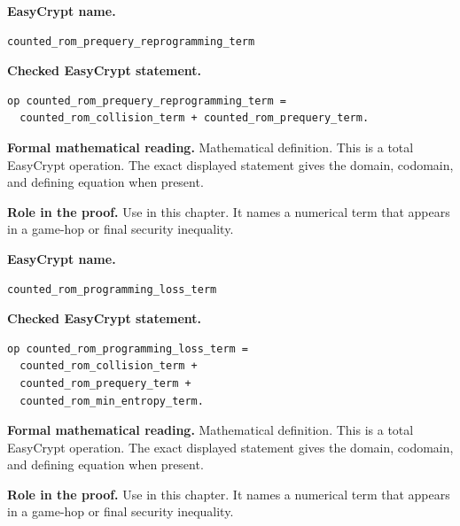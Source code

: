 \begin{formaldefinition}
\noindent\textbf{EasyCrypt name.}
\begin{lstlisting}[language=EasyCrypt,basicstyle=\ttfamily\scriptsize]
counted_rom_prequery_reprogramming_term
\end{lstlisting}
\noindent\textbf{Checked EasyCrypt statement.}
\begin{lstlisting}[language=EasyCrypt,basicstyle=\ttfamily\scriptsize]
op counted_rom_prequery_reprogramming_term =
  counted_rom_collision_term + counted_rom_prequery_term.
\end{lstlisting}
\noindent\textbf{Formal mathematical reading.}
Mathematical definition. This is a total EasyCrypt operation.  The exact displayed statement gives the domain, codomain, and defining equation when present.

\noindent\textbf{Role in the proof.}
Use in this chapter. It names a numerical term that appears in a game-hop or final security inequality.

\end{formaldefinition}

\begin{formaldefinition}
\noindent\textbf{EasyCrypt name.}
\begin{lstlisting}[language=EasyCrypt,basicstyle=\ttfamily\scriptsize]
counted_rom_programming_loss_term
\end{lstlisting}
\noindent\textbf{Checked EasyCrypt statement.}
\begin{lstlisting}[language=EasyCrypt,basicstyle=\ttfamily\scriptsize]
op counted_rom_programming_loss_term =
  counted_rom_collision_term +
  counted_rom_prequery_term +
  counted_rom_min_entropy_term.
\end{lstlisting}
\noindent\textbf{Formal mathematical reading.}
Mathematical definition. This is a total EasyCrypt operation.  The exact displayed statement gives the domain, codomain, and defining equation when present.

\noindent\textbf{Role in the proof.}
Use in this chapter. It names a numerical term that appears in a game-hop or final security inequality.

\end{formaldefinition}

